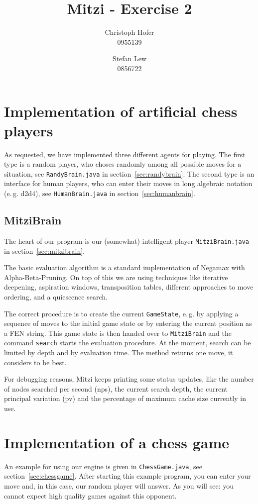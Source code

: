 \documentclass [12pt ,a4paper, english]{scrartcl}
\author{Christoph Hofer\\ 0955139 \and Stefan Lew \\ 0856722}
\title{Mitzi - Exercise 2}
\theoremstyle{plain}
\theoremstyle{definition}
\theoremstyle{remark}
\begin{document}
\maketitle
\newpage
\tableofcontents
\newpage
\section{Implementation of artificial chess players}
	As requested, we have implemented three different agents for playing. The first type is a random player, who choses randomly among all possible moves for a situation, see \verb+RandyBrain.java+ in section~\vref{sec:randybrain}. The second type is an interface for human players, who can enter their moves in long algebraic notation (e.\,g. d2d4), see \verb+HumanBrain.java+ in section~\vref{sec:humanbrain}. 
\subsection{MitziBrain}
The heart of our program is our (somewhat) intelligent player \verb+MitziBrain.java+ in section~\vref{sec:mitzibrain}.

The basic evaluation algorithm is a standard implementation of Negamax with Alpha-Beta-Pruning. On top of this we are using techniques like iterative deepening, aspiration windows, transposition tables, different approaches to move ordering, and a quiescence search.

The correct procedure is to create the current \verb+GameState+, e.\,g. by applying a sequence of moves to the initial game state or by entering the current position as a FEN string. This game state is then handed over to \verb+MitziBrain+ and the command \verb+search+ starts the evaluation procedure. At the moment, search can be limited by depth and by evaluation time. The method returns one move, it considers to be best.

For debugging reasons, Mitzi keeps printing some status updates, like the number of nodes searched per second (nps), the current search depth, the current principal variation (pv) and the percentage of maximum cache size currently in use.
	
\section{Implementation of a chess game}

An example for using our engine is given in \verb+ChessGame.java+, see section~\vref{sec:chessgame}. After starting this example program, you can enter your move and, in this case, our random player will answer. As you will see: you cannot expect high quality games against this opponent.
\end{document}
